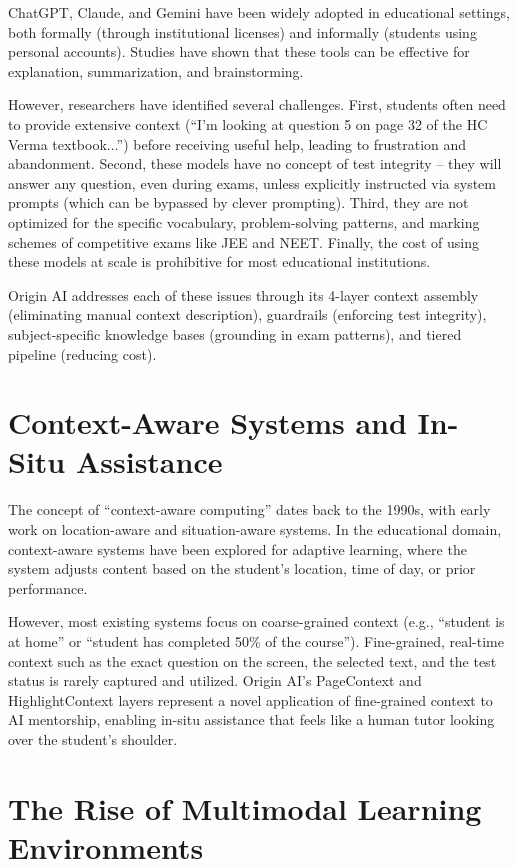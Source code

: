 ChatGPT, Claude, and Gemini have been widely adopted in educational settings, both formally (through institutional licenses) and informally (students using personal accounts). Studies have shown that these tools can be effective for explanation, summarization, and brainstorming.

However, researchers have identified several challenges. First, students often need to provide extensive context (``I'm looking at question 5 on page 32 of the HC Verma textbook...'') before receiving useful help, leading to frustration and abandonment. Second, these models have no concept of test integrity – they will answer any question, even during exams, unless explicitly instructed via system prompts (which can be bypassed by clever prompting). Third, they are not optimized for the specific vocabulary, problem-solving patterns, and marking schemes of competitive exams like JEE and NEET. Finally, the cost of using these models at scale is prohibitive for most educational institutions.

Origin AI addresses each of these issues through its 4-layer context assembly (eliminating manual context description), guardrails (enforcing test integrity), subject-specific knowledge bases (grounding in exam patterns), and tiered pipeline (reducing cost).

\section{Context-Aware Systems and In-Situ Assistance}

The concept of ``context-aware computing'' dates back to the 1990s, with early work on location-aware and situation-aware systems. In the educational domain, context-aware systems have been explored for adaptive learning, where the system adjusts content based on the student's location, time of day, or prior performance.

However, most existing systems focus on coarse-grained context (e.g., ``student is at home'' or ``student has completed 50\% of the course''). Fine-grained, real-time context such as the exact question on the screen, the selected text, and the test status is rarely captured and utilized. Origin AI's PageContext and HighlightContext layers represent a novel application of fine-grained context to AI mentorship, enabling in-situ assistance that feels like a human tutor looking over the student's shoulder.

\section{The Rise of Multimodal Learning Environments}

